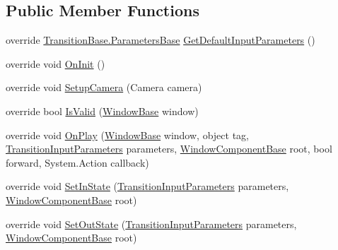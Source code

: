 \subsection*{Public Member Functions}
\begin{DoxyCompactItemize}
\item 
override \hyperlink{class_unity_engine_1_1_u_i_1_1_windows_1_1_animations_1_1_transition_base_1_1_parameters_base}{Transition\+Base.\+Parameters\+Base} \hyperlink{class_unity_engine_1_1_u_i_1_1_windows_1_1_animations_1_1_window_transition_basic_abce18038a8e805bff0b447bc87bcb847}{Get\+Default\+Input\+Parameters} ()
\item 
override void \hyperlink{class_unity_engine_1_1_u_i_1_1_windows_1_1_animations_1_1_window_transition_basic_ad577a47f1299db90902982e26313cd5a}{On\+Init} ()
\item 
override void \hyperlink{class_unity_engine_1_1_u_i_1_1_windows_1_1_animations_1_1_window_transition_basic_a55e72b5830ba1fe3ed1b862abcea9b89}{Setup\+Camera} (Camera camera)
\item 
override bool \hyperlink{class_unity_engine_1_1_u_i_1_1_windows_1_1_animations_1_1_window_transition_basic_a523daf083a009e0c739b34e65ddd4f87}{Is\+Valid} (\hyperlink{class_unity_engine_1_1_u_i_1_1_windows_1_1_window_base}{Window\+Base} window)
\item 
override void \hyperlink{class_unity_engine_1_1_u_i_1_1_windows_1_1_animations_1_1_window_transition_basic_ac52b3bc24598c66d6c9a884bfa5e5f99}{On\+Play} (\hyperlink{class_unity_engine_1_1_u_i_1_1_windows_1_1_window_base}{Window\+Base} window, object tag, \hyperlink{class_unity_engine_1_1_u_i_1_1_windows_1_1_animations_1_1_transition_input_parameters}{Transition\+Input\+Parameters} parameters, \hyperlink{class_unity_engine_1_1_u_i_1_1_windows_1_1_window_component_base}{Window\+Component\+Base} root, bool forward, System.\+Action callback)
\item 
override void \hyperlink{class_unity_engine_1_1_u_i_1_1_windows_1_1_animations_1_1_window_transition_basic_ab50740524bcf1eec15f11306efd3fd8c}{Set\+In\+State} (\hyperlink{class_unity_engine_1_1_u_i_1_1_windows_1_1_animations_1_1_transition_input_parameters}{Transition\+Input\+Parameters} parameters, \hyperlink{class_unity_engine_1_1_u_i_1_1_windows_1_1_window_component_base}{Window\+Component\+Base} root)
\item 
override void \hyperlink{class_unity_engine_1_1_u_i_1_1_windows_1_1_animations_1_1_window_transition_basic_abeb9c836b9b245b86a48ec33ead27d40}{Set\+Out\+State} (\hyperlink{class_unity_engine_1_1_u_i_1_1_windows_1_1_animations_1_1_transition_input_parameters}{Transition\+Input\+Parameters} parameters, \hyperlink{class_unity_engine_1_1_u_i_1_1_windows_1_1_window_component_base}{Window\+Component\+Base} root)

\end{DoxyCompactItemize}

